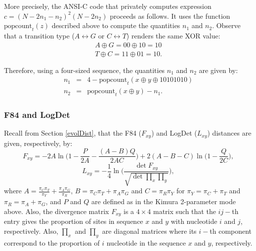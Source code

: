 More precisely, the ANSI-C code that privately computes expression $c = (N-2n_1-n_2)^2(N-2n_2)$ proceeds as follows. It uses the function $\text{popcount}_t(z)$ described above to compute the quantities $n_1$ and $n_2$. Observe that a transition type ($A\leftrightarrow G$ or $C\leftrightarrow T$) renders the same XOR value:
\begin{eqnarray*}
A \oplus G = 00 \oplus 10 = 10  \\
T \oplus C = 11 \oplus 01 = 10 .  
\end{eqnarray*}

Therefore, using a four-sized sequence, the quantities $n_1$ and $n_2$ are given by:
\begin{eqnarray*}
n_1 &=& 4 - \text{popcount}_t(x\oplus y\oplus 10101010)\\
n_2 &=& \text{popcount}_t(x\oplus y) - n_1.
\end{eqnarray*}





\subsubsection{F84 and LogDet}
Recall from Section \ref{evolDist}, that the F84 ($F_{xy} $) and LogDet ($L_{xy} $) distances are given, respectively, by:
\begin{equation}
    F_{xy} = -2 A\ln\bigg( 1- \frac{P}{2A} - \frac{(A-B)Q}{2AC} \bigg) + 2(A-B-C)\ln\bigg( 1-\frac{Q}{2C} \bigg),
\end{equation}
\begin{equation}
    L_{xy} = -\frac{1}{4}\ln\Bigg( \frac{\det F_{xy}}{\sqrt{\det \prod_x \prod_y}} \Bigg),
\end{equation}
where $A = \frac{\pi_C \pi_T}{\pi_Y} + \frac{\pi_A \pi_G}{\pi_R}$, $B=\pi_C\pi_T + \pi_A\pi_G$ and $C=\pi_R\pi_Y$ for $\pi_Y = \pi_C + \pi_T$ and $\pi_R = \pi_A + \pi_G$, and $P$ and $Q$ are defined as in the Kimura 2-parameter mode above. Also, the divergence matrix $F_{xy}$ is a $4\times 4$ matrix such that the $ij-$th entry gives the proportion of sites in sequence $x$ and $y$ with nucleotide $i$ and $j$, respectively. Also, $\prod_x$ and $\prod_y$ are diagonal matrices where its $i-$th component correspond to the proportion of $i$ nucleotide in the sequence $x$ and $y$, respectively.


